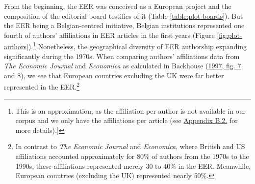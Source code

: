 \documentclass[
  12pt,
  onecolumn]{article}
\begin{document}
From the beginning, the EER was conceived as a European project and the
composition of the editorial board testifies of it (Table
\ref{table:plot-boards}). But the EER being a Belgian-centred
initiative, Belgian institutions represented one fourth of authors'
affiliations in EER articles in the first years (Figure
\ref{fig:plot-authors}).\footnote{This is an approximation, as the
  affiliation per author is not available in our corpus and we only have
  the affiliations per article (see
  \protect\hyperlink{author-affiliation}{Appendix B.2.} for more
  details).{]}} Nonetheless, the geographical diversity of EER
authorship expanding significantly during the 1970s. When comparing
authors' affiliations data from \emph{The Economic Journal} and
\emph{Economica} as calculated in Backhouse
(\protect\hyperlink{ref-backhouse1997a}{1997, fig. 7} and 8), we see
that European countries excluding the UK were far better represented in
the EER.\footnote{In contrast to \emph{The Economic Journal} and
  \emph{Economica}, where British and US affiliations accounted
  approximately for 80\% of authors from the 1970s to the 1990s, these
  affiliations represented merely 30 to 40\% in the EER. Meanwhile,
  European countries (excluding the UK) represented nearly 50\%.}

\begingroup\fontsize{3}{5}\selectfont
\end{document}
